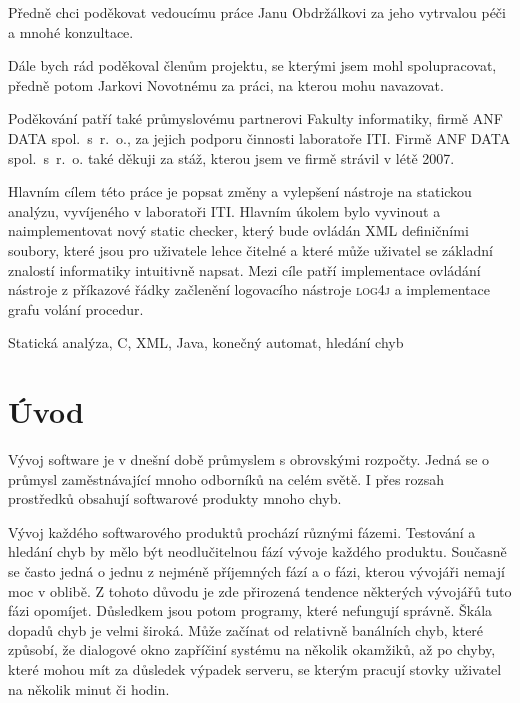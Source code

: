 \documentclass[11pt,final,oneside]{fithesis}
\begin{document}
\FrontMatter
\ThesisTitlePage

\begin{ThesisDeclaration}
\DeclarationText
\AdvisorName
\end{ThesisDeclaration}

\begin{ThesisThanks}
Předně chci poděkovat vedoucímu práce Janu Obdržálkovi za jeho vytrvalou péči a mnohé konzultace.

Dále bych rád poděkoval členům projektu, se kterými jsem mohl spolupracovat, předně potom Jarkovi Novotnému za práci, na kterou mohu navazovat.

Poděkování patří také průmyslovému partnerovi Fakulty informatiky, firmě ANF DATA spol.~s~r.~o., za jejich podporu činnosti laboratoře ITI. Firmě ANF DATA spol.~s~r.~o. také děkuji za stáž, kterou jsem ve firmě strávil v létě 2007. 
\end{ThesisThanks}

\begin{ThesisAbstract}
Hlavním cílem této práce je popsat změny a vylepšení nástroje na statickou analýzu, vyvíjeného v laboratoři ITI. Hlavním úkolem bylo vyvinout a naimplementovat nový static checker, který bude ovládán XML definičními soubory, které jsou pro uživatele lehce čitelné a které může uživatel se základní znalostí informatiky intuitivně napsat. Mezi cíle patří implementace ovládání nástroje z příkazové řádky začlenění logovacího nástroje \textsc{log4j} a implementace grafu volání procedur.
\end{ThesisAbstract}


\begin{ThesisKeyWords}
Statická analýza, C, XML, Java, konečný automat, hledání chyb
\end{ThesisKeyWords}

\MainMatter
\tableofcontents
\chapter{Úvod}
Vývoj software je v dnešní době průmyslem s obrovskými rozpočty. Jedná se o průmysl zaměstnávající mnoho odborníků na celém světě. I přes rozsah prostředků obsahují softwarové produkty mnoho chyb.

 Vývoj každého softwarového produktů prochází různými fázemi. Testování a hledání chyb by mělo být neodlučitelnou fází vývoje každého produktu. Současně se často jedná o jednu z nejméně příjemných fází a o fázi, kterou vývojáři nemají moc v oblibě. Z tohoto důvodu je zde přirozená tendence některých vývojářů tuto fázi opomíjet. Důsledkem jsou potom programy, které nefungují správně. Škála dopadů chyb je velmi široká. Může začínat od relativně banálních chyb, které způsobí, že dialogové okno zapříčiní  systému na několik okamžiků, až po chyby, které mohou mít za důsledek výpadek serveru, se kterým pracují stovky uživatel na několik minut či hodin.
  
\end{document}
